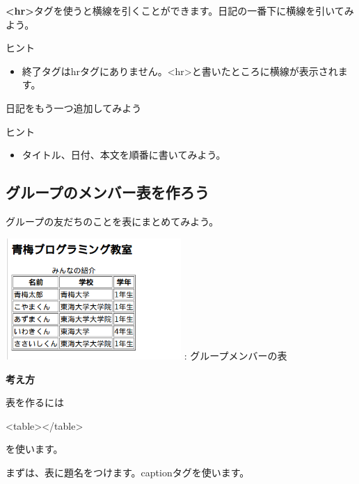 \documentclass[a4paper,12pt]{jarticle}
\begin{document}
\theQuestion\label{Q:hasAnswer04-8}
\textbf{{\textless}hr{\textgreater}}タグを使うと横線を引くことができます。日記の一番下に横線を引いてみよう。

ヒント

\begin{itemize}
  \item
        終了タグはhrタグにありません。{\textless}hr{\textgreater}と書いたところに横線が表示されます。
\end{itemize}
\theQuestion\label{Q:hasAnswer04-9}

日記をもう一つ追加してみよう

ヒント

\begin{itemize}
  \item
        タイトル、日付、本文を順番に書いてみよう。
\end{itemize}
\clearpage
{}
\subsection{\theExercise グループのメンバー表を作ろう}
グループの友だちのことを表にまとめてみよう。

\centering
\begin{minipage}{\textwidth}
  {\upshape
    \includegraphics[width=0.5\textwidth]{textbook-img189.png}
    \newline
    : グループメンバーの表}
\end{minipage}

\bigskip

\flushleft
\textbf{考え方}



表を作るには

{\textless}table{\textgreater}{\textless}/table{\textgreater}

を使います。

まずは、表に題名をつけます。captionタグを使います。
\end{document}
